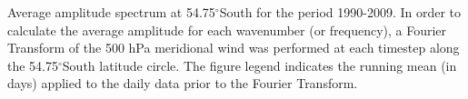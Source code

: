 \label{fig:fourier_spectrum}
Average amplitude spectrum at 54.75$^{\circ}$South for the period 1990-2009. In order to calculate the average amplitude for each wavenumber (or frequency), a Fourier Transform of the 500 hPa meridional wind was performed at each timestep along the 54.75$^{\circ}$South latitude circle. The figure legend indicates the running mean (in days) applied to the daily data prior to the Fourier Transform.  